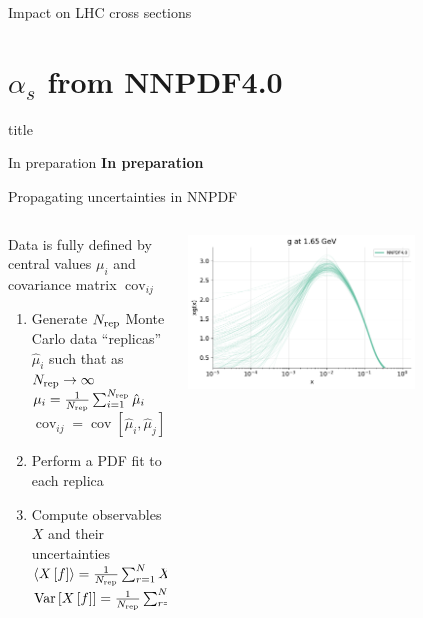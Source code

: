 \documentclass[aspectratio=169, 9pt,t]{beamer}
\newcommand{\SectionTitleFrame}[1][]{%
  \begin{frame}
    \vfill
    \centering
    \begin{beamercolorbox}[sep=8pt,center,shadow=true,rounded=true]{title}
      \usebeamerfont{title}\insertsection\par
    \end{beamercolorbox}
    \ifx\relax#1\relax\else
      \vspace{0.5cm}
      \textbf{#1}
    \fi
    \vfill
  \end{frame}
}
\begin{document}
\begin{frame}{Impact on LHC cross sections}
\end{frame}


\section*{$\alpha_s$ from NNPDF4.0}
\SectionTitleFrame[In preparation]

\begin{frame}{Propagating uncertainties in NNPDF}
  \begin{columns}
    \begin{column}{0.49\textwidth}
      Data is fully defined by central values $\mu_i$ and covariance matrix $\operatorname{cov}_{ij}$
      \begin{enumerate}
        \item Generate $N_{\rm rep}$ { Monte Carlo data} ``replicas'' $\hat{\mu}_i$ such that as $N_{\rm rep}\to \infty$ \\
        $\mu_i = \frac{1}{N_{\rm rep}}\sum_{i=1}^{N_{\rm rep}} \hat{\mu}_i$\\
        $\operatorname{cov}_{ij} = \operatorname{cov}[\hat{\mu}_i, \hat{\mu}_j]$
        \item Perform a { PDF fit} to each replica
        \item Compute observables $X$ and their uncertainties\\
        $\left\langle X\left[f\right]\right\rangle=\frac{1}{N_{\rm rep}} \sum_{r=1}^N X\left[f^{(r)}\right]$\\
        $\operatorname{Var}\left[X\left[f\right]\right] = \frac{1}{N_{\rm rep}} \sum_{r=1}^{N_{\rm rep}}\left(X\left[f^{(r)}\right]-\left\langle X\left[f\right]\right\rangle\right)^2$
      \end{enumerate}
    \end{column}
    \begin{column}{0.49\textwidth}
      \begin{center}
        \includegraphics[width=0.7\textwidth]{replicas_g.pdf}\\

\end{center}
\end{column}
\end{columns}
\end{frame}
\end{document}
